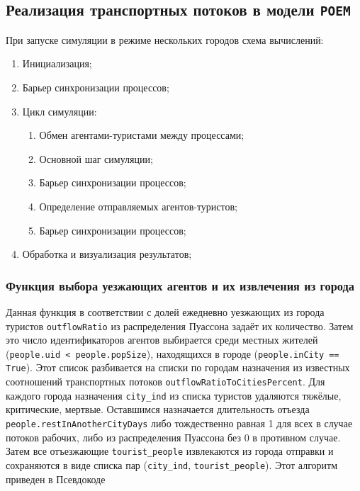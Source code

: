 \documentclass[a4paper,12pt]{article} %
\begin{document}
\subsection{Реализация транспортных потоков в модели \texttt{POEM}}
При запуске симуляции в режиме нескольких городов схема вычислений:

\begin{enumerate}
	\item Инициализация;
	\item Барьер синхронизации процессов;
	\item Цикл симуляции:
	\begin{enumerate}
		\item Обмен агентами-туристами между процессами;
		\item Основной шаг симуляции;
		\item Барьер синхронизации процессов;
		\item Определение отправляемых агентов-туристов;
		\item Барьер синхронизации процессов;
	\end{enumerate}
	\item Обработка и визуализация результатов;
\end{enumerate}

\subsubsection{Функция выбора уезжающих агентов и их извлечения из города}
Данная функция в соответствии с долей ежедневно уезжающих из города туристов \texttt{outflowRatio} из распределения Пуассона задаёт их количество. Затем это число идентификаторов агентов выбирается среди местных жителей (\texttt{people.uid < people.popSize}), находящихся в городе (\texttt{people.inCity == True}). Этот список разбивается на списки по городам назначения из известных соотношений транспортных потоков \texttt{outflowRatioToCitiesPercent}. Для каждого города назначения \texttt{city_ind} из списка туристов удаляются тяжёлые, критические, мертвые. Оставшимся назначается длительность отъезда \texttt{people.restInAnotherCityDays} либо тождественно равная 1 для всех в случае потоков рабочих, либо из распределения Пуассона без 0 в противном случае. Затем все отъезжающие \texttt{tourist_people} извлекаются из города отправки и сохраняются в виде списка пар (\texttt{city_ind}, \texttt{tourist_people}). Этот алгоритм приведен в Псевдокоде
\end{document}
